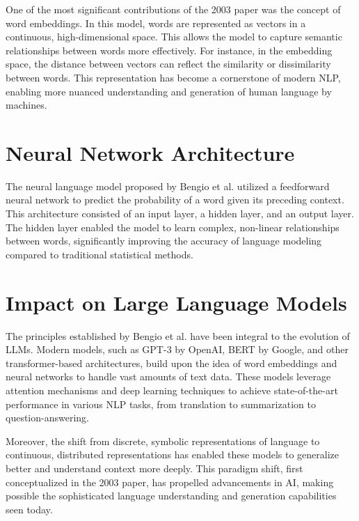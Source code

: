 One of the most significant contributions of the 2003 paper was the concept of word embeddings. In this model, words are represented as vectors in a continuous, high-dimensional space. This allows the model to capture semantic relationships between words more effectively. For instance, in the embedding space, the distance between vectors can reflect the similarity or dissimilarity between words. This representation has become a cornerstone of modern NLP, enabling more nuanced understanding and generation of human language by machines.

\section*{Neural Network Architecture}

The neural language model proposed by Bengio et al. utilized a feedforward neural network to predict the probability of a word given its preceding context. This architecture consisted of an input layer, a hidden layer, and an output layer. The hidden layer enabled the model to learn complex, non-linear relationships between words, significantly improving the accuracy of language modeling compared to traditional statistical methods.

\section*{Impact on Large Language Models}

The principles established by Bengio et al. have been integral to the evolution of LLMs. Modern models, such as GPT-3 by OpenAI, BERT by Google, and other transformer-based architectures, build upon the idea of word embeddings and neural networks to handle vast amounts of text data. These models leverage attention mechanisms and deep learning techniques to achieve state-of-the-art performance in various NLP tasks, from translation to summarization to question-answering.

Moreover, the shift from discrete, symbolic representations of language to continuous, distributed representations has enabled these models to generalize better and understand context more deeply. This paradigm shift, first conceptualized in the 2003 paper, has propelled advancements in AI, making possible the sophisticated language understanding and generation capabilities seen today.



%
